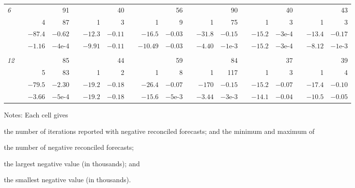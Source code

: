 \documentclass[twocolumn]{svjour3}
\begin{document}
\begin{table*}[!htbp]
\begin{threeparttable}
\begin{tabular}{lrrrrrrrrrrrrrrrrrr}
		{\it 6} & & & 91 & & & 40 & & & 56 &  & & 90 & & & 40 & & & 43\\
				& & 4 & 87 & & 1 & 3 & & 1 & 9 &  & 1 & 75 & & 1 & 3 & & 1 & 3\\
				& & $-87.4$ & $-0.62$ & & $-12.3$ & $-0.11$ & & $-16.5$ & $-0.03$ &  & $-31.8$ & $-0.15$ & & $-15.2$ & $-3$e-4 & & $-13.4$ & $-0.17$\\
				& & $-1.16$ & $-4$e-4 & & $-9.91$ & $-0.11$ & & $-10.49$ & $-0.03$ &  & $-4.40$ & $-1$e-3 & & $-15.2$ & $-3$e-4 & & $-8.12$ & $-1$e-3 \\ \\[-0.3cm]
		{\it 12} & & & 85 & & & 44 & & & 59 & & & 84 & & & 37 & & & 39 \\
				& & 5 & 83 & & 1 & 2 & & 1 & 8 & & 1 & 117 & & 1 & 3 & & 1 & 4 \\
				& & $-79.5$ & $-2.30$ & & $-19.2$ & $-0.18$ & & $-26.4$ & $-0.07$ & & $-170$ & $-0.15$ & & $-15.2$ & $-0.07$ & & $-17.4$ & $-0.10$ \\
				& & $-3.66$ & $-5$e-4 & & $-19.2$ & $-0.18$ & & $-15.6$ & $-5$e-3 & & $-3.44$ & $-3$e-3 & & $-14.1$ & $-0.04$ & & $-10.5$ & $-0.05$\\                                                                                                          
	\bottomrule
		\end{tabular}
		\begin{tablenotes}
			\item [] Notes: Each cell gives \begin{inparaenum}[(i)] \item the number of iterations reported with negative reconciled forecasts; and the minimum and maximum of \item the number of negative reconciled forecasts; \item the largest negative value (in thousands); and \item the smallest negative value (in thousands). \end{inparaenum}
		\end{tablenotes}
	\end{threeparttable}
\end{table*}
\end{document}
